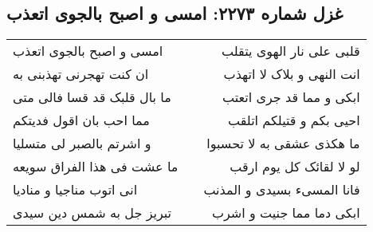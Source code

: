 \begin{center}
\section*{غزل شماره ۲۲۷۳: امسی و اصبح بالجوی اتعذب}
\label{sec:2273}
\begin{longtable}{l p{0.5cm} r}
امسی و اصبح بالجوی اتعذب
&&
قلبی علی نار الهوی یتقلب
\\
ان کنت تهجرنی تهذبنی به
&&
انت النهی و بلاک لا اتهذب
\\
ما بال قلبک قد قسا فالی متی
&&
ابکی و مما قد جری اتعتب
\\
مما احب بان اقول فدیتکم
&&
احیی بکم و قتیلکم اتلقب
\\
و اشرتم بالصبر لی متسلیا
&&
ما هکذی عشقی به لا تحسبوا
\\
ما عشت فی هذا الفراق سویعه
&&
لو لا لقائک کل یوم ارقب
\\
انی اتوب مناجیا و منادیا
&&
فانا المسیء بسیدی و المذنب
\\
تبریز جل به شمس دین سیدی
&&
ابکی دما مما جنیت و اشرب
\\
\end{longtable}
\end{center}
